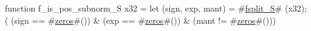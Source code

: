 function f_is_pos_subnorm_S   x32 = {
  let (sign, exp, mant) = #\hyperref[sailRISCVzfsplitzyS]{fsplit\_S}# (x32);
  (  (sign == #\hyperref[sailRISCVzzzeros]{zeros}#())
   & (exp  == #\hyperref[sailRISCVzzzeros]{zeros}#())
   & (mant != #\hyperref[sailRISCVzzzeros]{zeros}#()))
}
